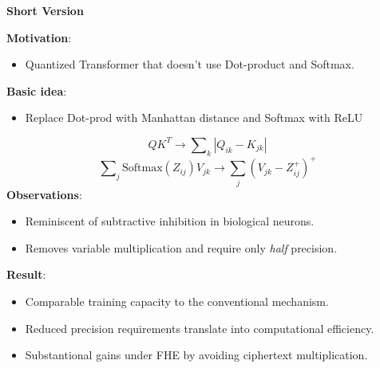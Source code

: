 \documentclass[12pt,oneside]{book}
\begin{document}
\begin{framed}
\begin{center}
    \Huge \textbf{Short Version}
\end{center}    
\Large
\noindent
\textbf{Motivation}: \begin{itemize}
    \item Quantized Transformer that doesn't use Dot-product and Softmax.
\end{itemize}

\noindent
\textbf{Basic idea}: 
\begin{itemize}
    \item Replace Dot-prod with Manhattan distance and Softmax with ReLU
\end{itemize}
\begin{equation*}
Q K^T \rightarrow \sum\nolimits_{k} \left|Q_{ik} - K_{jk}\right|
\end{equation*}
\begin{equation*}
\sum\nolimits_{j} \mathrm{Softmax} \left(Z_{ij}\right) V_{jk}  \rightarrow \sum_j \left( V_{jk} - Z_{ij}^+  \right)^+
    \label{eq:inhibition}
\end{equation*}
%
\noindent
\textbf{Observations}:
\begin{itemize}%
    \item Reminiscent of subtractive inhibition in biological neurons.
    \item Removes variable multiplication and require only \textit{half} precision.
\end{itemize}

\noindent
\textbf{Result}: 

\begin{itemize}
    \item Comparable training capacity to the conventional mechanism.
    \item Reduced precision requirements translate into computational efficiency.
    \item Substantional gains under FHE by avoiding ciphertext multiplication.
\end{itemize}


\end{framed}
\end{document}
